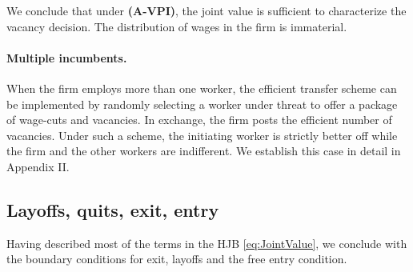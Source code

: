 We conclude that under \textbf{(A-VPI)}, the joint value is sufficient to characterize the vacancy decision. The distribution of wages in the firm is immaterial.

\vspace*{-.2cm}\paragraph{Multiple incumbents.}
When the firm employs more than one worker, the efficient transfer scheme can be implemented by randomly selecting a worker under threat to offer a package  of wage-cuts and vacancies.
In exchange, the firm posts the efficient number of vacancies.
Under such a scheme, the initiating worker is strictly better off while the firm and the other workers are indifferent.
We establish this case in detail in Appendix II.

\subsection{Layoffs, quits, exit, entry}
Having described most of the terms in the HJB \eqref{eq:JointValue}, we conclude with the boundary conditions for exit, layoffs and  the free entry condition.

